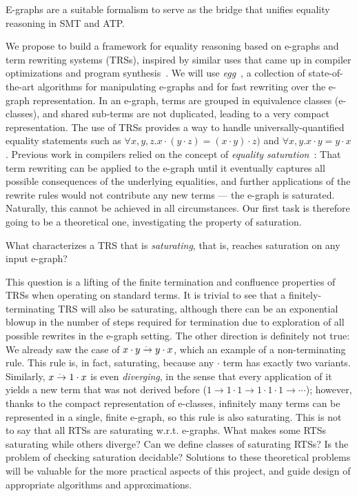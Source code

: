 \begin{proposal}E-graphs are a suitable formalism to serve as the bridge that unifies equality reasoning in SMT and ATP.
\end{proposal}

We propose to build a framework for equality reasoning based on e-graphs and term rewriting systems (TRSs), 
inspired by similar uses that came up in compiler optimizations and program synthesis~\cite{everything-zack}.
We will use \emph{egg}~\cite{egg}, a collection of state-of-the-art algorithms for manipulating e-graphs and for fast rewriting over the e-graph representation.
In an e-graph, terms are grouped in equivalence classes (e-classes), and shared sub-terms are not duplicated, leading to a very compact representation.
The use of TRSs provides a way to handle universally-quantified equality statements such as $\forall x,y,z. x\cdot(y\cdot z) = (x\cdot y)\cdot z)$ and $\forall x,y. x\cdot y = y \cdot x$.
Previous work in compilers relied on the concept of \emph{equality saturation}~\cite{equsat}:
That term rewriting can be applied to the e-graph until it eventually captures all possible consequences of the underlying equalities, and further applications of the rewrite rules would not contribute any new terms ---
the e-graph is saturated.
Naturally, this cannot be achieved in all circumstances.
Our first task is therefore going to be a theoretical one, investigating the property of saturation.

\begin{researchquestion}What characterizes a TRS that is \emph{saturating}, that is, reaches saturation on any input e-graph?
\end{researchquestion}
 
This question is a lifting of the finite termination and confluence properties of TRSs when operating on standard terms.
It is trivial to see that a finitely-terminating TRS will also be saturating,
although there can be an exponential blowup in the number of steps required for termination due to exploration of all possible rewrites in the e-graph setting.
The other direction is definitely not true:
We already saw the case of $x \cdot y \overset{.~}{\to} y\cdot x$, which an example of a non-terminating rule.
This rule is, in fact, saturating, because any $\cdot$ term has exactly two variants.
Similarly, $x \overset{.~}{\to} 1\cdot x$ is even \emph{diverging}, in the sense that every application of it yields a new term that was not derived before ($1 \to 1\cdot 1 \to 1\cdot 1 \cdot 1 \to \cdots$);
however, thanks to the compact representation of e-classes, infinitely many terms can be represented in a single, finite e-graph, so this rule is also saturating.
This is not to say that all RTSs are saturating w.r.t. e-graphs.
What makes some RTSs saturating while others diverge?
Can we define classes of saturating RTSs?
Is the problem of checking saturation decidable?
Solutions to these theoretical problems will be valuable for the more practical aspects of this project,
and guide design of appropriate algorithms and approximations.

